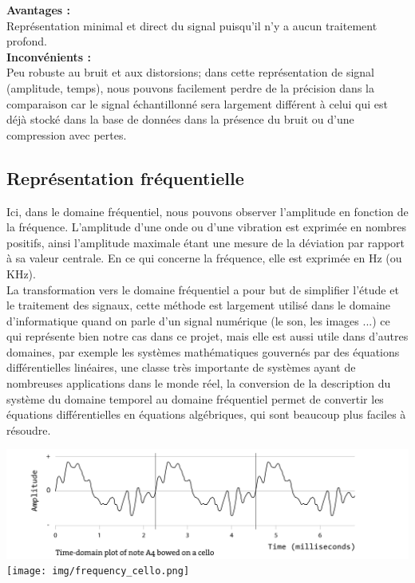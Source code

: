 \documentclass[11pt, report, french]{scrreprt}
\begin{document}
\textbf{Avantages :}\\

Représentation minimal et direct du signal puisqu'il n'y a aucun traitement profond.
\\

\textbf{Inconvénients :}\\

Peu robuste au bruit et aux distorsions; dans cette représentation de signal (amplitude, temps), nous pouvons facilement perdre de la précision dans la comparaison car le signal échantillonné sera largement différent à celui qui est déjà stocké dans la base de données dans la présence du bruit ou d'une compression avec pertes.

\subsection{Représentation fréquentielle}
Ici, dans le domaine fréquentiel, nous pouvons observer l'amplitude en fonction de la fréquence. L'amplitude d'une onde ou d'une vibration est exprimée en nombres positifs, ainsi l'amplitude maximale étant une mesure de la déviation par rapport à sa valeur centrale. En ce qui concerne la fréquence, elle est exprimée en Hz (ou KHz).\\
La transformation vers le domaine fréquentiel a pour but de simplifier l'étude et le traitement des signaux, cette méthode est largement utilisé dans le domaine d'informatique quand on parle d'un signal numérique (le son, les images ...) ce qui représente bien notre cas dans ce projet, mais elle est aussi utile dans d'autres domaines, par exemple les systèmes mathématiques gouvernés par des équations différentielles linéaires, une classe très importante de systèmes ayant de nombreuses applications dans le monde réel, la conversion de la description du système du domaine temporel au domaine fréquentiel permet de convertir les équations différentielles en équations algébriques, qui sont beaucoup plus faciles à résoudre.\\


\begin{center}
	\includegraphics[scale=0.4]{img/time_cello.png}\vspace{1cm}
	\texttt{[image: img/frequency\_cello.png]}
\end{center}
\end{document}
